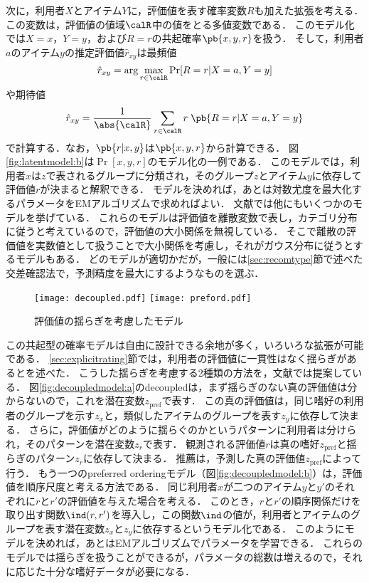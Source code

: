 次に，利用者$X$とアイテム$Y$に，評価値を表す確率変数$R$も加えた拡張を考える．
この変数は，評価値の値域$\calR$中の値をとる多値変数である．
このモデル化では$X=x$，$Y=y$，および$R=r$の共起確率$\pb{x,y,r}$を扱う．
そして，利用者$a$のアイテム$y$の推定評価値$\hat{r}_{xy}$は最頻値
\[
\hat{r}_{xy}=\arg\max_{r\in\calR}\Pr[R=r|X=a,Y=y]
\]
や期待値
\[
\hat{r}_{xy}=\frac{1}{\abs{\calR}}\sum_{r\in\calR}r\;\pb{R=r|X=a,Y=y}
\]
で計算する．なお，$\pb{r|x,y}$は$\pb{x,y,r}$から計算できる．
図\ref{fig:latentmodel:b}は$\Pr[x,y,r]$のモデル化の一例である．
このモデルでは，利用者$x$は$z$で表されるグループに分類され，そのグループ$z$とアイテム$y$に依存して評価値$r$が決まると解釈できる．
モデルを決めれば，あとは対数尤度を最大化するパラメータをEMアルゴリズムで求めればよい．
文献\cite{ijcai:99:01}では他にもいくつかのモデルを挙げている．
これらのモデルは評価値を離散変数で表し，カテゴリ分布に従うと考えているので，評価値の大小関係を無視している．
そこで離散の評価値を実数値として扱うことで大小関係を考慮し，それがガウス分布に従うとするモデルもある\cite{sigir:03:01}．
どのモデルが適切かだが，一般には\ref{sec:recomtype}節で述べた交差確認法で，予測精度を最大にするようなものを選ぶ．

\begin{figure}
\centering
{}%
{\texttt{[image: decoupled.pdf]}}
\hspace{0.1\fullwidth}%
%
{\texttt{[image: preford.pdf]}}
\caption{評価値の揺らぎを考慮したモデル\cite{uai:03:01}}
\label{fig:decoupledmodel}
\end{figure}

この共起型の確率モデルは自由に設計できる余地が多く，いろいろな拡張が可能である．
\ref{sec:explicitrating}節では，利用者の評価値に一貫性はなく揺らぎがあるとを述べた．
こうした揺らぎを考慮する2種類の方法を，文献\cite{uai:03:01}では提案している．
図\ref{fig:decoupledmodel:a}のdecoupledは，まず揺らぎのない真の評価値は分からないので，これを潜在変数$z_\mathrm{pref}$で表す．
この真の評価値は，同じ嗜好の利用者のグループを示す$z_x$と，類似したアイテムのグループを表す$z_y$に依存して決まる．
さらに，評価値がどのように揺らぐのかというパターンに利用者は分けられ，そのパターンを潜在変数$z_r$で表す．
観測される評価値$r$は真の嗜好$z_\mathrm{pref}$と揺らぎのパターン$z_r$に依存して決まる．
推薦は，予測した真の評価値$z_\mathrm{pref}$によって行う．
もう一つのpreferred orderingモデル（図\ref{fig:decoupledmodel:b}）は，評価値を順序尺度と考える方法である．
同じ利用者$x$が二つのアイテム$y$と$y'$のそれぞれに$r$と$r'$の評価値を与えた場合を考える．
このとき，$r$と$r'$の順序関係だけを取り出す関数$\ind(r,r')$を導入し，この関数$\ind$の値が，利用者とアイテムのグループを表す潜在変数$z_x$と$z_y$に依存するというモデル化である．
このようにモデルを決めれば，あとはEMアルゴリズムでパラメータを学習できる．
これらのモデルでは揺らぎを扱うことができるが，パラメータの総数は増えるので，それに応じた十分な嗜好データが必要になる．

